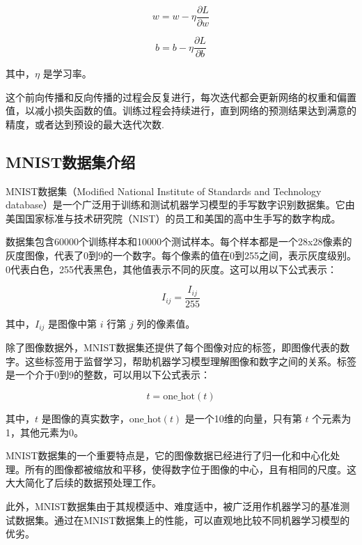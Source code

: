 \documentclass{ctexart}
\begin{document}
    \begin{equation}
    w = w - \eta \frac{\partial L}{\partial w}
    \end{equation}

    \begin{equation}
    b = b - \eta \frac{\partial L}{\partial b}
    \end{equation}

    其中，$\eta$ 是学习率。

    这个前向传播和反向传播的过程会反复进行，每次迭代都会更新网络的权重和偏置值，以减小损失函数的值。训练过程会持续进行，直到网络的预测结果达到满意的精度，或者达到预设的最大迭代次数\cite{Rumelhart1986}.
    \subsection{MNIST数据集介绍}
    MNIST数据集（Modified National Institute of Standards and Technology database）是一个广泛用于训练和测试机器学习模型的手写数字识别数据集。它由美国国家标准与技术研究院（NIST）的员工和美国的高中生手写的数字构成。

    数据集包含60000个训练样本和10000个测试样本。每个样本都是一个28x28像素的灰度图像，代表了0到9的一个数字。每个像素的值在0到255之间，表示灰度级别。0代表白色，255代表黑色，其他值表示不同的灰度。这可以用以下公式表示：

    \begin{equation}
    I_{ij} = \frac{I_{ij}}{255}
    \end{equation}

    其中，$I_{ij}$ 是图像中第 $i$ 行第 $j$ 列的像素值。

    除了图像数据外，MNIST数据集还提供了每个图像对应的标签，即图像代表的数字。这些标签用于监督学习，帮助机器学习模型理解图像和数字之间的关系。标签是一个介于0到9的整数，可以用以下公式表示：

    \begin{equation}
    t = \text{one\_hot}(t)
    \end{equation}

    其中，$t$ 是图像的真实数字，$\text{one\_hot}(t)$ 是一个10维的向量，只有第 $t$ 个元素为1，其他元素为0。

    MNIST数据集的一个重要特点是，它的图像数据已经进行了归一化和中心化处理。所有的图像都被缩放和平移，使得数字位于图像的中心，且有相同的尺度。这大大简化了后续的数据预处理工作。

    此外，MNIST数据集由于其规模适中、难度适中，被广泛用作机器学习的基准测试数据集。通过在MNIST数据集上的性能，可以直观地比较不同机器学习模型的优劣\cite{LeCun1998}。
\end{document}
